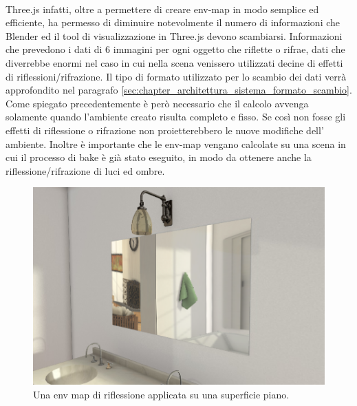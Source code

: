 \\
Three.js infatti, oltre a permettere di creare env-map in modo semplice ed efficiente, ha permesso di diminuire notevolmente il numero di informazioni che Blender ed il tool di visualizzazione in Three.js devono scambiarsi. Informazioni che prevedono i dati di 6 immagini per ogni oggetto che riflette o rifrae, dati che diverrebbe enormi nel caso in cui nella scena venissero utilizzati decine di effetti di riflessioni/rifrazione. Il tipo di formato utilizzato per lo scambio dei dati verrà approfondito nel paragrafo \ref{sec:chapter_architettura_sistema_formato_scambio}.
\\
Come spiegato precedentemente è però necessario che il calcolo avvenga solamente quando l’ambiente creato risulta completo e fisso. Se così non fosse gli effetti di riflessione o rifrazione non proietterebbero le nuove modifiche dell’ ambiente.
Inoltre è importante che le env-map vengano calcolate su una scena in cui il processo di bake è già stato eseguito, in modo da ottenere anche la riflessione/rifrazione di luci ed ombre.
\\
\begin{figure}[htb]
 \centering
 \includegraphics[width=1\linewidth]{images/chapter_lrl/lrl_envspecchio.png}\hfill
 \caption[Env map di riflessione]{Una env map di riflessione applicata su una superficie piano.}
 \label{fig:lrl_envspecchio}
\end{figure}

